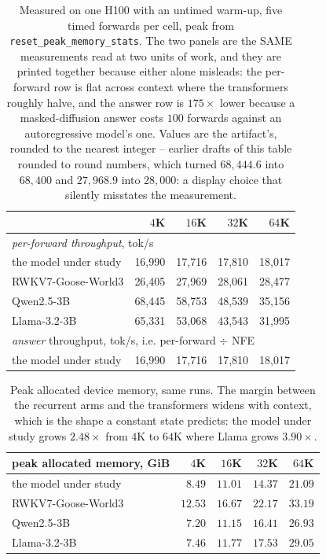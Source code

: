 \documentclass[11pt]{article}
\begin{document}
\begin{table}[t]
\centering
\begin{tabular}{lrrrr}
\toprule
 & $4$K & $16$K & $32$K & $64$K \\
\midrule
\multicolumn{5}{l}{\emph{per-forward throughput}, tok/s} \\
the model under study & 16,990 & 17,716 & 17,810 & 18,017 \\
RWKV7-Goose-World3   & 26,405 & 27,969 & 28,061 & 28,477 \\
Qwen2.5-3B           & 68,445 & 58,753 & 48,539 & 35,156 \\
Llama-3.2-3B         & 65,331 & 53,068 & 43,543 & 31,995 \\
\midrule
\multicolumn{5}{l}{\emph{answer} throughput, tok/s, i.e. per-forward $\div$ NFE} \\
the model under study & 16,990 & 17,716 & 17,810 & 18,017 \\
\bottomrule
\end{tabular}
\caption{Measured on one H100 with an untimed warm-up, five timed forwards per cell, peak
from \texttt{reset\_peak\_memory\_stats}. The two panels are the SAME measurements read at
two units of work, and they are printed together because either alone misleads: the
per-forward row is flat across context where the transformers roughly halve, and the answer
row is $175\times$ lower because a masked-diffusion answer costs $100$ forwards against an
autoregressive model's one. Values are the artifact's, rounded to the nearest integer --
earlier drafts of this table rounded to round numbers, which turned $68{,}444.6$ into
$68{,}400$ and $27{,}968.9$ into $28{,}000$: a display choice that silently misstates the
measurement.}
\label{tab:eff-measured}
\end{table}

\begin{table}[t]
\centering
\begin{tabular}{lrrrr}
\toprule
peak allocated memory, GiB & $4$K & $16$K & $32$K & $64$K \\
\midrule
the model under study & $8.49$ & $11.01$ & $14.37$ & $21.09$ \\
RWKV7-Goose-World3   & $12.53$ & $16.67$ & $22.17$ & $33.19$ \\
Qwen2.5-3B           & $7.20$ & $11.15$ & $16.41$ & $26.93$ \\
Llama-3.2-3B         & $7.46$ & $11.77$ & $17.53$ & $29.05$ \\
\bottomrule\end{tabular}
\caption{Peak allocated device memory, same runs. The margin between the recurrent arms and
the transformers widens with context, which is the shape a constant state predicts: the
model under study grows $2.48\times$ from $4$K to $64$K where Llama grows $3.90\times$.}
\label{tab:eff-peak}
\end{table}
\end{document}
